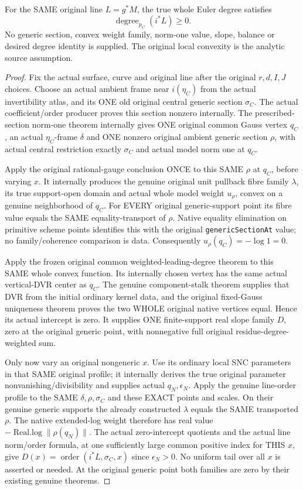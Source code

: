 \begin{theorem}
For the SAME original line $L=g^*M$, the true whole Euler degree satisfies
\[
 \operatorname{degree}_{p_C}(i^*L)\ge0.
\]
No generic section, convex weight family, norm-one value, slope, balance or
desired degree identity is supplied.  The original local convexity is the
analytic source assumption.
\end{theorem}
\begin{proof}
Fix the actual surface, curve and original line after the original
$r,d,I,J$ choices.  Choose an actual ambient frame near $i(\eta_C)$ from
the actual invertibility atlas, and its ONE old original central generic
section $\sigma_C$.  The actual coefficient/order producer proves this
section nonzero internally.  The prescribed-section norm-one theorem
internally gives ONE original common Gauss vertex $q_C$, an actual
$\eta_C$-frame $\delta$ and ONE nonzero original ambient generic section
$\rho$, with actual central restriction exactly $\sigma_C$ and actual
model norm one at $q_C$.

Apply the original rational-gauge conclusion ONCE to this SAME $\rho$ at
$q_C$, before varying $x$.  It internally produces the genuine original
unit pullback fibre family $\lambda$, its true support-open domain and
actual whole model weight $u_\rho$, convex on a genuine neighborhood of
$q_C$.  For EVERY original generic-support point its fibre value equals
the SAME equality-transport of $\rho$.  Native equality elimination on
primitive scheme points identifies this with the original
\texttt{genericSectionAt} value; no family/coherence comparison is data.
Consequently $u_\rho(q_C)=-\log1=0$.

Apply the frozen original common weighted-leading-degree theorem to this
SAME whole convex function.  Its internally chosen vertex has the same
actual vertical-DVR center as $q_C$.  The genuine component-stalk theorem
supplies that DVR from the initial ordinary kernel data, and the original
fixed-Gauss uniqueness theorem proves the two WHOLE original native
vertices equal.  Hence its actual intercept is zero.  It supplies ONE
finite-support real slope family $D$, zero at the original generic point,
with nonnegative full original residue-degree-weighted sum.

Only now vary an original nongeneric $x$.  Use its ordinary local SNC
parameters in that SAME original profile; it internally derives the true
original parameter nonvanishing/divisibility and supplies actual
$q_N,\epsilon_N$.  Apply the genuine line-order profile to the SAME
$\delta,\rho,\sigma_C$ and these EXACT points and scales.  On their genuine
generic supports the already constructed $\lambda$ equals the SAME
transported $\rho$.  The native extended-log weight therefore has real
value $-\operatorname{Real.log}\|\rho(q_N)\|$.  The actual zero-intercept
quotients and the actual line norm/order formula, at one sufficiently
large common positive index for THIS $x$, give
$D(x)=\operatorname{order}(i^*L,\sigma_C,x)$ since $\epsilon_N>0$.
No uniform tail over all $x$ is asserted or needed.  At the original
generic point both families are zero by their existing genuine theorems.


\end{proof}
